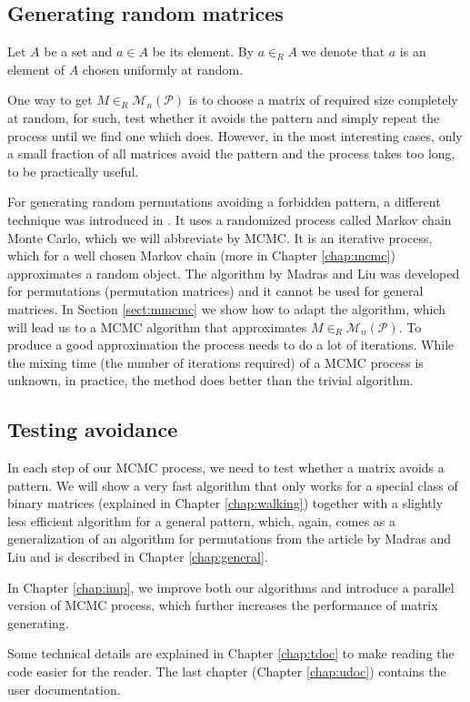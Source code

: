 \subsection*{Generating random matrices}
\begin{ntn}
Let $A$ be a set and $a\in A$ be its element. By $a\in_R A$ we denote that $a$ is an element of $A$ chosen uniformly at random.
\end{ntn}
One way to get $M\in_R\mathcal{M}_n(\mathcal{P})$ is to choose a matrix of required size completely at random, for such, test whether it avoids the pattern and simply repeat the process until we find one which does. However, in the most interesting cases, only a small fraction of all matrices avoid the pattern and the process takes too long, to be practically useful.

For generating random permutations avoiding a forbidden pattern, a different technique was introduced in \cite{MadrasLiu-mcmc}. It uses a randomized process called Markov chain Monte Carlo, which we will abbreviate by MCMC. It is an iterative process, which for a well chosen Markov chain (more in Chapter \ref{chap:mcmc}) approximates a random object. The algorithm by Madras and Liu was developed for permutations (permutation matrices) and it cannot be used for general matrices. In Section \ref{sect:mmcmc} we show how to adapt the algorithm, which will lead us to a MCMC algorithm that approximates $M\in_R\mathcal{M}_n(\mathcal{P})$. To produce a good approximation the process needs to do a lot of iterations. While the mixing time (the number of iterations required) of a MCMC process is unknown, in practice, the method does better than the trivial algorithm.
\subsection*{Testing avoidance}
In each step of our MCMC process, we need to test whether a matrix avoids a pattern. We will show a very fast algorithm that only works for a special class of binary matrices (explained in Chapter \ref{chap:walking}) together with a slightly less efficient algorithm for a general pattern, which, again, comes as a generalization of an algorithm for permutations from the article by Madras and Liu and is described in Chapter \ref{chap:general}.

In Chapter \ref{chap:imp}, we improve both our algorithms and introduce a parallel version of MCMC process, which further increases the performance of matrix generating.

Some technical details are explained in Chapter \ref{chap:tdoc} to make reading the code easier for the reader. The last chapter (Chapter \ref{chap:udoc}) contains the user documentation.